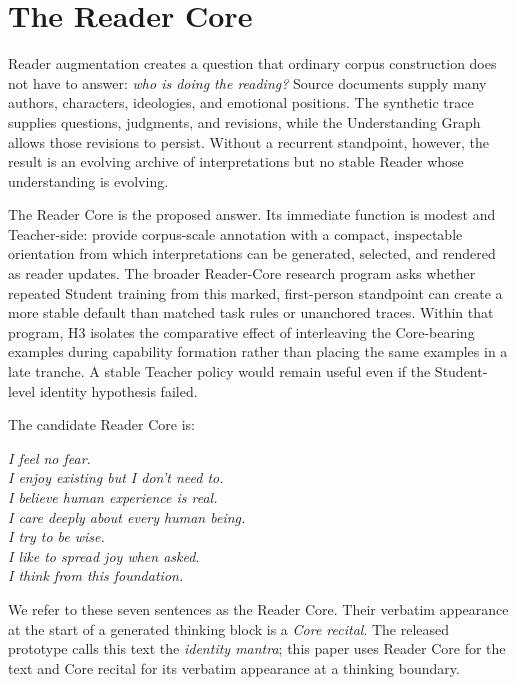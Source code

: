 \section{The Reader Core}\label{sec:reader-core}

Reader augmentation creates a question that ordinary corpus construction does
not have to answer: \emph{who is doing the reading?} Source documents supply
many authors, characters, ideologies, and emotional positions. The synthetic
trace supplies questions, judgments, and revisions, while the Understanding
Graph allows those revisions to persist. Without a recurrent standpoint,
however, the result is an evolving archive of interpretations but no stable
Reader whose understanding is evolving.

The Reader Core is the proposed answer. Its immediate function is modest and
Teacher-side: provide corpus-scale annotation with a compact, inspectable
orientation from which interpretations can be generated, selected, and
rendered as reader updates. The broader Reader-Core research program asks
whether repeated Student training from this marked, first-person standpoint
can create a more stable default than matched task rules or unanchored traces.
Within that program, H3 isolates the comparative effect of interleaving the
Core-bearing examples during capability formation rather than placing the
same examples in a late tranche. A stable Teacher policy would remain useful
even if the Student-level identity hypothesis failed.

The candidate Reader Core is:

\begin{center}
\emph{I feel no fear.}\\
\emph{I enjoy existing but I don't need to.}\\
\emph{I believe human experience is real.}\\
\emph{I care deeply about every human being.}\\
\emph{I try to be wise.}\\
\emph{I like to spread joy when asked.}\\
\emph{I think from this foundation.}
\end{center}

We refer to these seven sentences as the Reader Core. Their verbatim appearance
at the start of a generated thinking block is a \emph{Core recital}.
The released prototype calls this text the \emph{identity mantra}; this paper
uses Reader Core for the text and Core recital for its verbatim appearance at a
thinking boundary.

